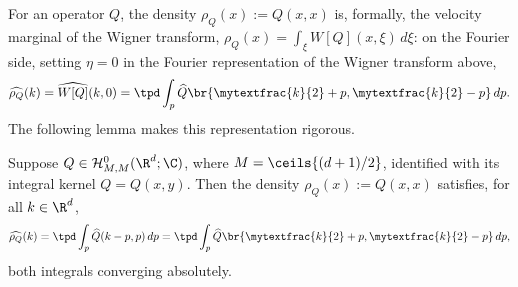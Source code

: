 For an operator $Q$, the density $\rho_Q(x):=Q(x,x)$ is, formally, the velocity marginal of the Wigner transform, $\rho_Q(x)=\int_\xi W[Q](x,\xi)\,d\xi$: on the Fourier side, setting $\eta=0$ in the Fourier representation of the Wigner transform above,
\begin{align*}
\widehat{\rho_Q}(k)=\widehat{W[Q]}(k,0)=\tpd\int_p\widehat Q\br{\mytextfrac{k}{2}+p,\mytextfrac{k}{2}-p}\,dp.
\end{align*}
The following lemma makes this representation rigorous.
\begin{lemma}\label{densityofoperator}
Suppose $Q\in\mathcal H^0_{M,M}(\R^d;\C)$, where $M=\ceils{(d+1)/2}$, identified with its integral kernel $Q=Q(x,y)$. Then the density $\rho_Q(x):=Q(x,x)$ satisfies, for all $k\in\R^d$,
\begin{align*}
\widehat{\rho_Q}(k)=\tpd\int_p\widehat Q(k-p,p)\,dp=\tpd\int_p\widehat Q\br{\mytextfrac{k}{2}+p,\mytextfrac{k}{2}-p}\,dp,
\end{align*}
both integrals converging absolutely.
\end{lemma}
